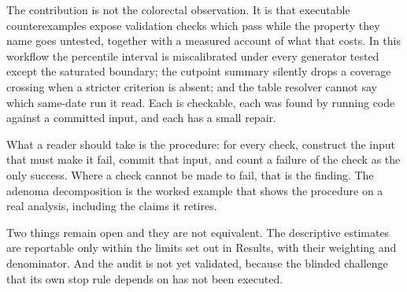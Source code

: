 
The contribution is not the colorectal observation. It is that executable
counterexamples expose validation checks which pass while the property they name
goes untested, together with a measured account of what that costs. In this
workflow the percentile interval is miscalibrated under every generator tested
except the saturated boundary; the cutpoint summary silently drops a coverage
crossing when a stricter criterion is absent; and the table resolver cannot say
which same-date run it read. Each is checkable, each was found by running code
against a committed input, and each has a small repair.

What a reader should take is the procedure: for every check, construct the input
that must make it fail, commit that input, and count a failure of the check as
the only success. Where a check cannot be made to fail, that is the finding. The
adenoma decomposition is the worked example that shows the procedure on a real
analysis, including the claims it retires.

Two things remain open and they are not equivalent. The descriptive estimates are
reportable only within the limits set out in Results, with their weighting and
denominator. And the audit is not yet validated, because the blinded challenge
that its own stop rule depends on has not been executed.
